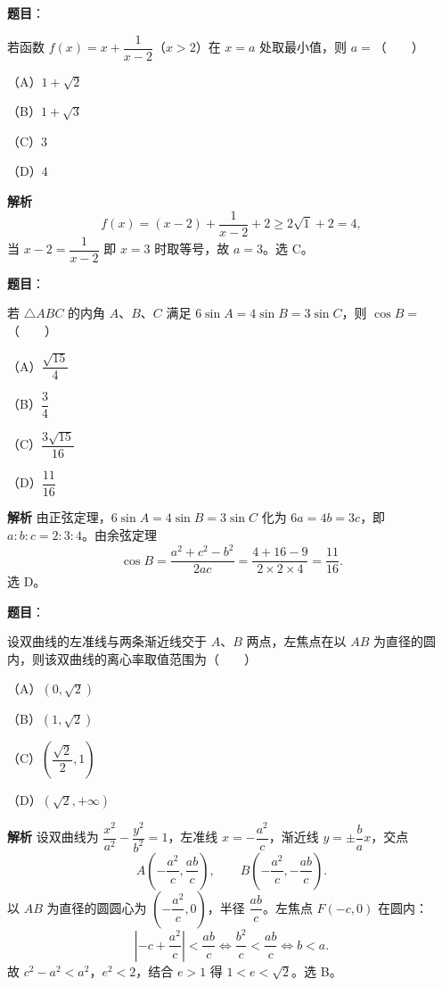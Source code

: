 \begin{answer}

\textbf{题目}：

若函数 $f(x)=x+\dfrac1{x-2}$（$x>2$）在 $x=a$ 处取最小值，则 $a=$\mbox{（　　）}

（A）$1+\sqrt2$

（B）$1+\sqrt3$

（C）$3$

（D）$4$

\textbf{解析}
\nopagebreak[4]
\[f(x)=(x-2)+\frac1{x-2}+2\geqslant2\sqrt1+2=4,\]
当 $x-2=\dfrac1{x-2}$ 即 $x=3$ 时取等号，故 $a=3$。选 C。


\end{answer}
\begin{answer}

\textbf{题目}：

若 $\triangle ABC$ 的内角 $A$、$B$、$C$ 满足 $6\sin A=4\sin B=3\sin C$，则 $\cos B=$\mbox{（　　）}

（A）$\dfrac{\sqrt{15}}4$

（B）$\dfrac34$

（C）$\dfrac{3\sqrt{15}}{16}$

（D）$\dfrac{11}{16}$

\textbf{解析}
由正弦定理，$6\sin A=4\sin B=3\sin C$ 化为 $6a=4b=3c$，即 $a:b:c=2:3:4$。由余弦定理
\nopagebreak[4]
\[\cos B=\frac{a^2+c^2-b^2}{2ac}=\frac{4+16-9}{2\times2\times4}=\frac{11}{16}.\]
选 D。


\end{answer}
\begin{answer}

\textbf{题目}：

设双曲线的左准线与两条渐近线交于 $A$、$B$ 两点，左焦点在以 $AB$ 为直径的圆内，则该双曲线的离心率取值范围为\mbox{（　　）}

（A）$\left(0,\sqrt2\right)$

（B）$\left(1,\sqrt2\right)$

（C）$\left(\dfrac{\sqrt2}2,1\right)$

（D）$\left(\sqrt2,+\infty\right)$

\textbf{解析}
设双曲线为 $\dfrac{x^2}{a^2}-\dfrac{y^2}{b^2}=1$，左准线 $x=-\dfrac{a^2}c$，渐近线 $y=\pm\dfrac bax$，交点
\nopagebreak[4]
\[A\left(-\frac{a^2}c,\frac{ab}c\right),\qquad B\left(-\frac{a^2}c,-\frac{ab}c\right).\]
以 $AB$ 为直径的圆圆心为 $\left(-\dfrac{a^2}c,0\right)$，半径 $\dfrac{ab}c$。左焦点 $F(-c,0)$ 在圆内：
\nopagebreak[4]
\[\left|-c+\frac{a^2}c\right|<\frac{ab}c\Longleftrightarrow\frac{b^2}c<\frac{ab}c\Longleftrightarrow b<a.\]
故 $c^2-a^2<a^2$，$e^2<2$，结合 $e>1$ 得 $1<e<\sqrt2$。选 B。


\end{answer}
